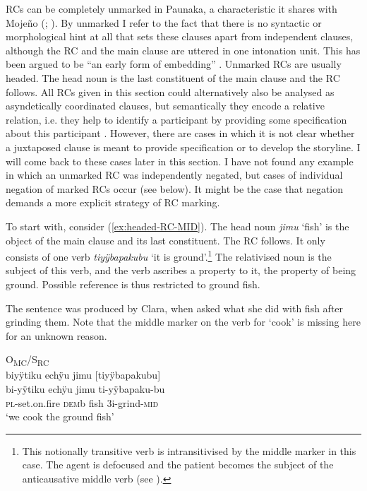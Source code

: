 RCs can be completely unmarked in Paunaka, a characteristic it shares with Mojeño (\citealp[cf.][596--597]{OlzaZubiri2004}; \citealt[92]{Rose2014a}). By unmarked I refer to the fact that there is no syntactic or morphological hint at all that sets these clauses apart from independent clauses, although the RC and the main clause are uttered in one intonation unit. This has been argued to be “an early form of embedding” \citep[6]{Givon2012}. Unmarked RCs are usually headed. The head noun is the last constituent of the main clause and the RC follows. All RCs given in this section could alternatively also be analysed as asyndetically coordinated clauses, but semantically they encode a relative relation, i.e. they help to identify a participant by providing some specification about this participant \citep[195]{Cristofaro2003}. However, there are cases in which it is not clear whether a juxtaposed clause is meant to provide specification or to develop the storyline. I will come back to these cases later in this section. I have not found any example in which an unmarked RC was independently negated, but cases of individual negation of marked RCs occur (see  below). It might be the case that negation demands a more explicit strategy of RC marking.

To start with, consider (\ref{ex:headed-RC-MID}). The head noun \textit{jimu} ‘fish’ is the object of the main clause and its last constituent. The RC follows. It only consists of one verb \textit{tiyÿbapakubu} ‘it is ground’.\footnote{This notionally transitive verb is intransitivised by the middle marker in this case. The agent is defocused and the patient becomes the subject of the anticausative middle verb (see ).} The relativised noun is the subject of this verb, and the verb ascribes a property to it, the property of being ground. Possible reference is thus restricted to ground fish.

\largerpage
The sentence was produced by Clara, when asked what she did with fish after grinding them. Note that the middle marker on the verb for ‘cook’ is missing here for an unknown reason.

\ea\label{ex:headed-RC-MID}
\begingl
\glpreamble  \textup{O\textsubscript{MC}/S\textsubscript{RC}}\\biyÿtiku echÿu jimu \textup{[}tiyÿbapakubu\textup{]}\\
\gla bi-yÿtiku echÿu jimu ti-yÿbapaku-bu\\
\textsc{pl}-set.on.fire \textsc{dem}b fish 3i-grind-\textsc{mid}\\
\glft ‘we cook the ground fish’
\endgl
\trailingcitation{[cux-c120414ls-2.168]}
\xe

